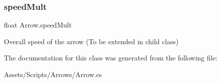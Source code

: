 \subsubsection{\texorpdfstring{speed\+Mult}{speedMult}}
{\footnotesize\ttfamily float Arrow.\+speed\+Mult}

Overall speed of the arrow (To be extended in child class) 

The documentation for this class was generated from the following file\+:\begin{DoxyCompactItemize}
\item 
Assets/\+Scripts/\+Arrows/Arrow.\+cs\end{DoxyCompactItemize}
